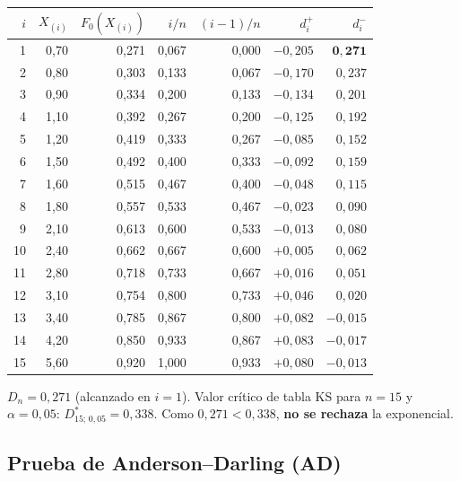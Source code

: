 \documentclass[11pt, letterpaper]{article}
\begin{document}
\begin{ejemplobox}
\begin{center}\scriptsize
\renewcommand{\arraystretch}{1.15}
\begin{tabular}{rrrrrrr}
\toprule
$i$ & $X_{(i)}$ & $F_0(X_{(i)})$ & $i/n$ & $(i-1)/n$ & $d_i^+$ & $d_i^-$ \\
\midrule
1 & 0{,}70 & 0{,}271 & 0{,}067 & 0{,}000 & $-0{,}205$ & $\mathbf{0{,}271}$ \\
2 & 0{,}80 & 0{,}303 & 0{,}133 & 0{,}067 & $-0{,}170$ & $0{,}237$ \\
3 & 0{,}90 & 0{,}334 & 0{,}200 & 0{,}133 & $-0{,}134$ & $0{,}201$ \\
4 & 1{,}10 & 0{,}392 & 0{,}267 & 0{,}200 & $-0{,}125$ & $0{,}192$ \\
5 & 1{,}20 & 0{,}419 & 0{,}333 & 0{,}267 & $-0{,}085$ & $0{,}152$ \\
6 & 1{,}50 & 0{,}492 & 0{,}400 & 0{,}333 & $-0{,}092$ & $0{,}159$ \\
7 & 1{,}60 & 0{,}515 & 0{,}467 & 0{,}400 & $-0{,}048$ & $0{,}115$ \\
8 & 1{,}80 & 0{,}557 & 0{,}533 & 0{,}467 & $-0{,}023$ & $0{,}090$ \\
9 & 2{,}10 & 0{,}613 & 0{,}600 & 0{,}533 & $-0{,}013$ & $0{,}080$ \\
10 & 2{,}40 & 0{,}662 & 0{,}667 & 0{,}600 & $+0{,}005$ & $0{,}062$ \\
11 & 2{,}80 & 0{,}718 & 0{,}733 & 0{,}667 & $+0{,}016$ & $0{,}051$ \\
12 & 3{,}10 & 0{,}754 & 0{,}800 & 0{,}733 & $+0{,}046$ & $0{,}020$ \\
13 & 3{,}40 & 0{,}785 & 0{,}867 & 0{,}800 & $+0{,}082$ & $-0{,}015$ \\
14 & 4{,}20 & 0{,}850 & 0{,}933 & 0{,}867 & $+0{,}083$ & $-0{,}017$ \\
15 & 5{,}60 & 0{,}920 & 1{,}000 & 0{,}933 & $+0{,}080$ & $-0{,}013$ \\
\bottomrule
\end{tabular}
\end{center}

$D_n = 0{,}271$ (alcanzado en $i=1$). Valor crítico de tabla KS para $n=15$ y $\alpha=0{,}05$: $D^*_{15;\,0{,}05} = 0{,}338$. Como $0{,}271 < 0{,}338$, \textbf{no se rechaza} la exponencial.
\end{ejemplobox}

\subsection{Prueba de Anderson--Darling (AD)}
\end{document}
